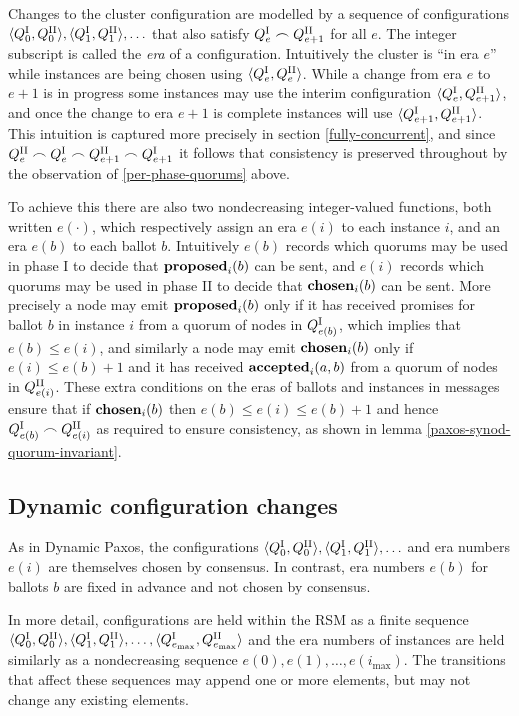 \documentclass[journal]{IEEEtran}
\begin{document}
Changes to the cluster configuration are modelled by a sequence of
configurations $ \langle {Q}^\textrm{I}_{0}, {Q}^\textrm{II}_{0} \rangle, \langle {Q}^\textrm{I}_{1}, {Q}^\textrm{II}_{1}
\rangle, \ldots$ that also satisfy ${Q}^\textrm{I}_{e} \frown {Q}^\textrm{II}_{e+1}$ for all $e$.  The
integer subscript is called the \textit{era} of a configuration.  Intuitively
the cluster is ``in era $e$'' while instances are being chosen using $\langle
{Q}^\textrm{I}_{e}, {Q}^\textrm{II}_{e}\rangle$. While a change from era $e$ to $e+1$ is in progress
some instances may use the interim configuration $\langle {Q}^\textrm{I}_{e}, {Q}^\textrm{II}_{e+1}
\rangle$, and once the change to era $e+1$ is complete instances will use
$\langle {Q}^\textrm{I}_{e+1}, {Q}^\textrm{II}_{e+1} \rangle$. This intuition is captured more
precisely in section \ref{fully-concurrent}, and since ${Q}^\textrm{II}_{e} \frown {Q}^\textrm{I}_{e}
\frown {Q}^\textrm{II}_{e+1} \frown {Q}^\textrm{I}_{e+1}$ it follows that consistency is preserved
throughout by the observation of \ref{per-phase-quorums} above.

To achieve this there are also two nondecreasing integer-valued functions, both
written $e(\cdot)$, which respectively assign an era $e(i)$ to each instance
$i$, and an era $e(b)$ to each ballot $b$. Intuitively $e(b)$ records which
quorums may be used in phase I to decide that $\mathbf{proposed}_{i}(b)$ can be sent, and
$e(i)$ records which quorums may be used in phase II to decide that
$\mathbf{chosen}_{i}(b)$ can be sent. More precisely a node may emit $\mathbf{proposed}_{i}(b)$ only
if it has received promises for ballot $b$ in instance $i$ from a quorum of
nodes in ${Q}^\textrm{I}_{e(b)}$, which implies that $e(b) \le e(i)$, and similarly a node
may emit $\mathbf{chosen}_{i}(b)$ only if ${e(i) \le e(b)+1}$ and it has received
$\mathbf{accepted}_{i}(a,b)$ from a quorum of nodes in ${Q}^\textrm{II}_{e(i)}$. These extra conditions
on the eras of ballots and instances in messages ensure that if $\mathbf{chosen}_{i}(b)$
then ${e(b) \le e(i) \le e(b)+1}$ and hence ${Q}^\textrm{I}_{e(b)} \frown {Q}^\textrm{II}_{e(i)}$ as
required to ensure consistency, as shown in lemma
\ref{paxos-synod-quorum-invariant}.

\subsection{Dynamic configuration changes}

As in Dynamic Paxos, the configurations $\langle {Q}^\textrm{I}_{0}, {Q}^\textrm{II}_{0} \rangle,
\langle {Q}^\textrm{I}_{1}, {Q}^\textrm{II}_{1} \rangle, \ldots$ and era numbers $e(i)$ are themselves
chosen by consensus. In contrast, era numbers $e(b)$ for ballots $b$ are fixed
in advance and not chosen by consensus.

In more detail, configurations are held within the RSM as a finite sequence
$\langle {Q}^\textrm{I}_{0}, {Q}^\textrm{II}_{0} \rangle, \langle {Q}^\textrm{I}_{1}, {Q}^\textrm{II}_{1} \rangle, \ldots,
\langle {Q}^\textrm{I}_{e_\mathrm{max}}, {Q}^\textrm{II}_{e_\mathrm{max}} \rangle$ and the era numbers
of instances are held similarly as a nondecreasing sequence $e(0), e(1),
\ldots, e(i_\mathrm{max})$.  The transitions that affect these sequences may
append one or more elements, but may not change any existing elements.
\end{document}
